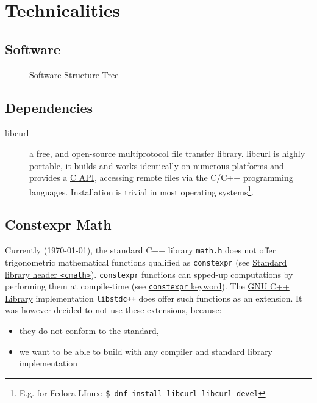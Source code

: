 \chapter{Technicalities}
\label{ch:technicalities}

\section{Software}
\label{se:software}

\begin{figure}
\centering

\caption{Software Structure Tree}
\label{fig:software-structure-tree}
\end{figure}

\section{Dependencies}
\begin{description}
    \item [libcurl] a free, and open-source multiprotocol file transfer library.
    \href{https://curl.se/libcurl/}{libcurl} is highly portable, it builds and works 
    identically on numerous platforms and provides a \href{https://curl.se/libcurl/c/}{C API}, 
    accessing remote files via the C/C++ programming languages. Installation is 
    trivial in most operating systems\footnote{E.g. for Fedora LInux: \lstinline[language=bash]|$ dnf install libcurl libcurl-devel|}.

\end{description}

\section{Constexpr Math}
Currently (\today), the standard C++ library \texttt{math.h} does not offer trigonometric mathematical 
functions qualified as \texttt{constexpr} (see \href{https://en.cppreference.com/w/cpp/header/cmath}{Standard library header \texttt{<cmath>}}).
\texttt{constexpr} functions can spped-up computations by performing them at compile-time 
(see \href{https://en.cppreference.com/w/cpp/language/constexpr}{\texttt{constexpr} keyword}). 
The \href{https://gcc.gnu.org/onlinedocs/libstdc++/}{GNU C++ Library} implementation \texttt{libstdc++} 
does offer such functions as an extension. It was however decided to not use these 
extensions, because:
\begin{itemize}
    \item they do not conform to the standard,
    \item we want to be able to build with any compiler and standard library implementation
\end{itemize}

